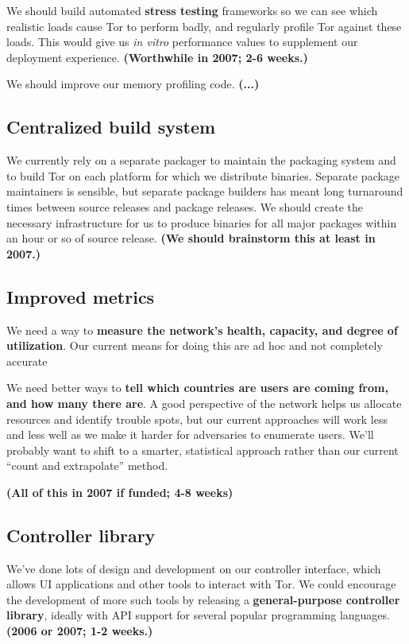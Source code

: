 \documentclass{article}
\newcommand{\tmp}[1]{{\bf #1} [......] \\}
\newcommand{\plan}[1]{ {\bf (#1)}}
\begin{document}
We should build automated {\bf stress testing} frameworks so we can see which
realistic loads cause Tor to perform badly, and regularly profile Tor against
these loads.  This would give us {\it in vitro} performance values to
supplement our deployment experience.\plan{Worthwhile in 2007; 2-6 weeks.}

We should improve our memory profiling code.\plan{...}


\subsection{Centralized build system}
We currently rely on a separate packager to maintain the packaging system and
to build Tor on each platform for which we distribute binaries.  Separate
package maintainers is sensible, but separate package builders has meant
long turnaround times between source releases and package releases.  We
should create the necessary infrastructure for us to produce binaries for all
major packages within an hour or so of source release.\plan{We should
  brainstorm this at least in 2007.}

\subsection{Improved metrics}
We need a way to {\bf measure the network's health, capacity, and degree of
  utilization}.  Our current means for doing this are ad hoc and not
completely accurate

We need better ways to {\bf tell which countries are users are coming from,
  and how many there are}.  A good perspective of the network helps us
allocate resources and identify trouble spots, but our current approaches
will work less and less well as we make it harder for adversaries to
enumerate users.  We'll probably want to shift to a smarter, statistical
approach rather than our current ``count and extrapolate'' method.

\plan{All of this in 2007 if funded; 4-8 weeks}


\subsection{Controller library}
We've done lots of design and development on our controller interface, which
allows UI applications and other tools to interact with Tor.  We could
encourage the development of more such tools by releasing a {\bf
  general-purpose controller library}, ideally with API support for several
popular programming languages.\plan{2006 or 2007; 1-2 weeks.}
\end{document}
